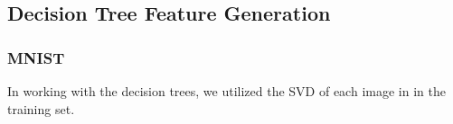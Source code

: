 \subsection{Decision Tree Feature Generation}

\subsubsection{MNIST}

In working with the decision trees, we utilized the SVD of each image in in the training set. 
